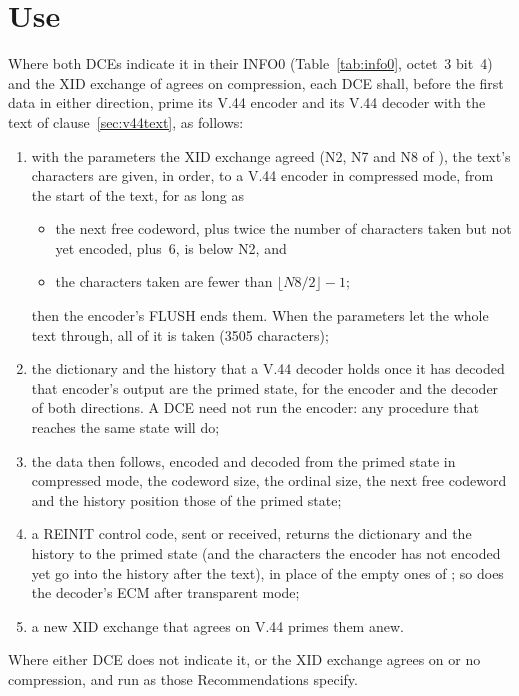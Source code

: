 \section{Use}
Where both DCEs indicate it in their INFO0 (Table~\ref{tab:info0},
octet~3 bit~4) and the XID exchange of
 agrees on  compression, each DCE shall, before the
first data in either direction, prime its V.44 encoder and its V.44
decoder with the text of clause~\ref{sec:v44text}, as follows:
\begin{enumerate}[label=\alph*)]
\item with the parameters the XID exchange agreed (N2, N7 and N8 of
  ), the text's characters are given, in order, to a V.44
  encoder in compressed mode, from the start of the text, for as long as
  \begin{itemize}
  \item the next free codeword, plus twice the number of characters
    taken but not yet encoded, plus~6, is below N2, and
  \item the characters taken are fewer than $\lfloor N8/2 \rfloor - 1$;
  \end{itemize}
  then the encoder's FLUSH ends them. When the parameters let the whole
  text through, all of it is taken (3505 characters);
\item the dictionary and the history that a V.44 decoder holds once it
  has decoded that encoder's output are the primed state, for the
  encoder and the decoder of both directions. A DCE need not run the
  encoder: any procedure that reaches the same state will do;
\item the data then follows, encoded and decoded from the primed state
  in compressed mode, the codeword size, the ordinal size, the next free
  codeword and the history position those of the primed state;
\item a REINIT control code, sent or received, returns the dictionary
  and the history to the primed state (and the characters the encoder has
  not encoded yet go into the history after the text), in place of the
  empty ones of ; so does the decoder's ECM after transparent
  mode;
\item a new XID exchange that agrees on V.44 primes them anew.
\end{enumerate}
Where either DCE does not indicate it, or the XID exchange agrees on
 or no compression,  and  run as those
Recommendations specify.

